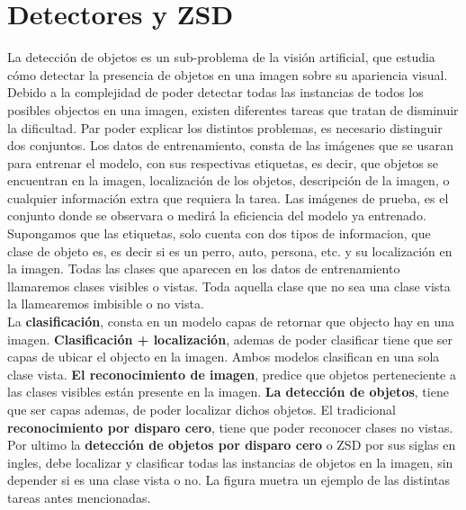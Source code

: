 \section{Detectores y ZSD}
La detección de objetos es un sub-problema de la visión artificial, que estudia cómo detectar la presencia de objetos en una imagen sobre su apariencia visual. Debido a la complejidad de poder detectar todas las instancias de todos los posibles objectos en una imagen, existen diferentes tareas que tratan de disminuir la dificultad.  Par poder explicar los distintos problemas, es necesario distinguir dos conjuntos. Los datos de entrenamiento, consta de las imágenes que se usaran para entrenar el modelo, con sus respectivas etiquetas, es decir, que objetos se encuentran en la imagen, localización de los objetos, descripción de la imagen, o cualquier información extra que requiera la tarea. Las imágenes de prueba, es el conjunto donde se observara o medirá la eficiencia del modelo ya entrenado. Supongamos que las etiquetas, solo cuenta con dos tipos de informacion, que clase de objeto es, es decir si es un perro, auto, persona, etc. y su localización en la imagen. Todas las clases que aparecen en los datos de entrenamiento llamaremos clases visibles o vistas. Toda aquella clase que no sea una clase vista la llamearemos imbisible o no vista.\\
La \textbf{clasificación}, consta en un modelo capas de retornar que objecto hay en una imagen.\textbf{ Clasificación + localización}, ademas de poder clasificar tiene que ser capas de ubicar el objecto en la imagen. Ambos modelos clasifican en una sola clase vista.\textbf{ El reconocimiento de imagen}, predice que objetos perteneciente a las clases visibles están presente en la imagen. \textbf{La detección de objetos}, tiene que ser capas ademas, de poder localizar dichos objetos. El tradicional \textbf{reconocimiento por disparo cero}, tiene que poder reconocer clases no vistas. Por ultimo la \textbf{detección de objetos por disparo cero} o ZSD por sus siglas en ingles, debe localizar y clasificar todas las instancias de objetos en la imagen, sin depender si es una clase vista o no. La figura {} muetra un ejemplo de las distintas tareas antes mencionadas. \\
